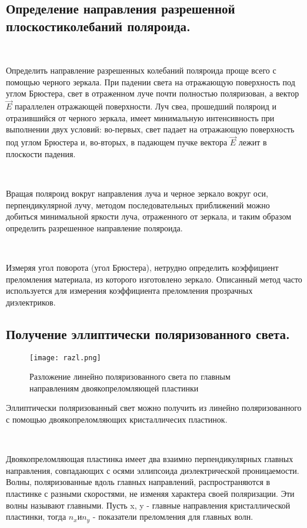 \documentclass[12pt,a4paper]{article}
\begin{document}
\subsection{Определение направления разрешенной плоскостиколебаний поляроида.}

	\

	Определить направление разрешенных колебаний поляроида проще всего с помощью черного зеркала.
	При падении света на отражающую поверхность под углом Брюстера, свет в отраженном луче почти полностью поляризован, а вектор $ \vec{E}$ параллелен отражающей поверхности. Луч свеа, прошедший поляроид и отразившийся от черного зеркала,
	имеет минимальную интенсивность при выполнении двух условий: во-первых, свет падает на отражающую поверхность под углом Брюстера и, во-вторых, в падающем пучке вектора $\vec{E}$ лежит в плоскости падения.

	\

	Вращая поляроид вокруг направления луча и черное зеркало вокруг оси, перпендикулярной лучу, методом последовательных приближений можно добиться минимальной яркости луча, отраженного от зеркала,
	и таким образом определить разрешенное направление поляроида.

	\

	Измеряя угол поворота (угол Брюстера), нетрудно определить коэффициент преломления материала, из которого изготовлено зеркало. Описанный метод часто используется для измерения коэффициента преломления прозрачных диэлектриков.

\subsection{Получение эллиптически поляризованного света.}

\begin{wrapfigure}[]{r}{130pt}
	\texttt{[image: razl.png]}
	\caption{Разложение линейно поляризованного света по главным направлениям двоякопреломляющей пластинки}
	\label{p10}
	\end{wrapfigure}

	Эллиптически поляризованный свет можно получить из линейно поляризованного с помощью двоякопреломляющих кристалличесих пластинок.

	\

	Двоякопреломляющая пластинка имеет два взаимно перпендикулярных главных направления, совпадающих с осями эллипсоида диэлектрической проницаемости. Волны, поляризованные вдоль главных направлений, распространяются в пластинке с разными скоростями, не изменяя характера своей
 поляризации. Эти волны называют главными. Пусть x, y - главные направления кристаллической пластинки, тогда $n_x  и n_y$ - показатели преломления для главных волн.
\end{document}
